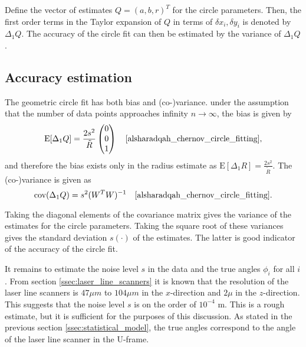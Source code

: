 Define the vector of estimates $Q = (a, b, r)^T$ for the circle parameters. Then, the first order terms in the Taylor expansion of $Q$ in terms of $\delta x_i, \delta y_i$ is denoted by $\Delta_1Q$. The accuracy of the circle fit can then be estimated by the variance of $\Delta_1Q$ \cite[section 2]{alsharadqah_chernov_circle_fitting}.

\subsection{Accuracy estimation}
The geometric circle fit has both bias and (co-)variance. under the assumption that the number of data points approaches infinity $n \rightarrow \infty$, the bias is given by
\begin{equation}
    \text{E}[\Delta_1 Q] = \frac{2s^2}{\tilde{R}} \begin{pmatrix} 0 \\ 0 \\ 1 \end{pmatrix} \quad \text{\cite[equation 6.14]{alsharadqah_chernov_circle_fitting}},
    \label{eq:circle_fit_bias}
\end{equation}
and therefore the bias exists only in the radius estimate as $\text{E}[\Delta_1 R] =\frac{2s^2}{\tilde{R}}$. The (co-)variance is given as
\begin{equation}
    \text{cov}(\Delta_1 Q) = s^2 (W^T W)^{-1} \quad \text{\cite[equation 8.12]{alsharadqah_chernov_circle_fitting}}.
    \label{eq:circle_fit_variance}
\end{equation}

Taking the diagonal elements of the covariance matrix gives the variance of the estimates for the circle parameters. Taking the square root of these variances gives the standard deviation $s(\cdot)$ of the estimates. The latter is good indicator of the accuracy of the circle fit.

It remains to estimate the noise level $s$ in the data and the true angles $\phi_i$ for all $i$. From section \ref{ssec:laser_line_scanners} it is known that the resolution of the laser line scanners is $47 \mu m$ to $104 \mu m$ in the $x$-direction and $2 \mu$ in the $z$-direction. This suggests that the noise level $s$ is on the order of $10^{-4}$ m. This is a rough estimate, but it is sufficient for the purposes of this discussion. As stated in the previous section \ref{ssec:statistical_model}, the true angles correspond to the angle of the laser line scanner in the U-frame.

